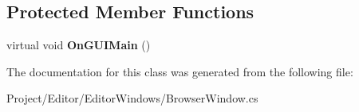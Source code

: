 \subsection*{Protected Member Functions}
\begin{DoxyCompactItemize}
\item 
\mbox{\label{class_lerp2_a_p_i_editor_1_1_editor_windows_1_1_browser_window_a1139c5e7eff7088651430deab884b9ed}} 
virtual void {\bfseries On\+G\+U\+I\+Main} ()
\end{DoxyCompactItemize}


The documentation for this class was generated from the following file\+:\begin{DoxyCompactItemize}
\item 
Project/\+Editor/\+Editor\+Windows/Browser\+Window.\+cs\end{DoxyCompactItemize}
